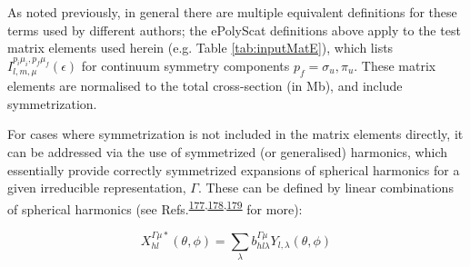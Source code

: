 \documentclass[10pt]{article}
\begin{document}
As noted previously, in general there are multiple equivalent definitions for these terms used by different authors; the ePolyScat definitions above apply to the test matrix elements used herein (e.g. Table \ref{tab:inputMatE}), which lists $I_{l,m,\mu}^{p_{i}\mu_{i},p_{f}\mu_{f}}(\epsilon)$ for continuum symmetry components $p_f=\sigma_u,\pi_u$. These matrix elements are normalised to the total cross-section (in Mb), and include symmetrization. 



For cases where symmetrization is not included in the matrix elements directly, it can be addressed via the use of symmetrized (or generalised) harmonics, which essentially provide correctly symmetrized expansions of spherical harmonics for a given irreducible representation, $\Gamma$. These can be defined by linear combinations of spherical harmonics (see Refs.\textsuperscript{\hyperref[csl:177]{177},\hyperref[csl:178]{178},\hyperref[csl:179]{179}} for more):

\begin{equation}
X_{hl}^{\Gamma\mu*}(\theta,\phi)=\sum_{\lambda}b_{hl\lambda}^{\Gamma\mu}Y_{l,\lambda}(\theta,\phi)\label{eq:symm-harmonics}
\end{equation}
\end{document}
